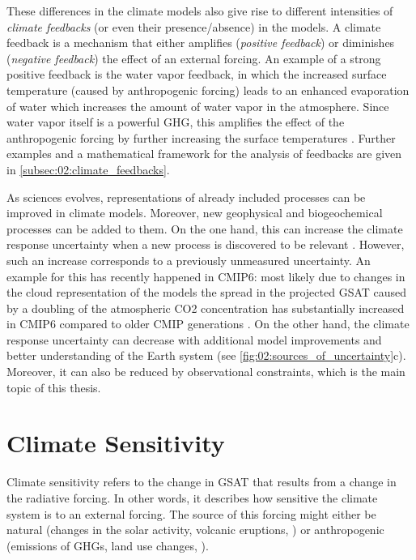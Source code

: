 These differences in the climate models also give rise to different intensities
of \emph{climate feedbacks} (or even their presence/absence) in the models. A
climate feedback is a mechanism that either amplifies (\emph{positive
  feedback}) or diminishes (\emph{negative feedback}) the effect of an external
forcing. An example of a strong positive feedback is the water vapor feedback,
in which the increased surface temperature (caused by anthropogenic forcing)
leads to an enhanced evaporation of water which increases the amount of water
vapor in the atmosphere. Since water vapor itself is a powerful \ac{GHG}, this
amplifies the effect of the anthropogenic forcing by further increasing the
surface temperatures \autocite{Cubasch2013}. Further examples and a
mathematical framework for the analysis of feedbacks are given in
\cref{subsec:02:climate_feedbacks}.

As sciences evolves, representations of already included processes can be
improved in climate models. Moreover, new geophysical and biogeochemical
processes can be added to them. On the one hand, this can increase the climate
response uncertainty when a new process is discovered to be relevant
. However,
such an increase corresponds to a previously unmeasured uncertainty. An example
for this has recently happened in \acs{CMIP}6: most likely due to changes in
the cloud representation of the models the spread in the projected \ac{GSAT}
caused by a doubling of the atmospheric \ac{CO2} concentration has
substantially increased in \ac{CMIP}6 compared to older \ac{CMIP} generations
\autocite{Zelinka2020}. On the other hand, the climate response uncertainty can
decrease with additional model improvements and better understanding of the
Earth system (see \cref{fig:02:sources_of_uncertainty}c). Moreover, it can also
be reduced by observational constraints, which is the main topic of this
thesis.


\section{Climate Sensitivity}
\label{sec:02:climate_sensitivity}

Climate sensitivity refers to the change in \ac{GSAT} that results from a
change in the radiative forcing. In other words, it describes how sensitive the
climate system is to an external forcing. The source of this forcing might
either be natural (changes in the solar activity, volcanic eruptions, \etc{})
or anthropogenic (emissions of \acp{GHG}, land use changes, \etc{}).



